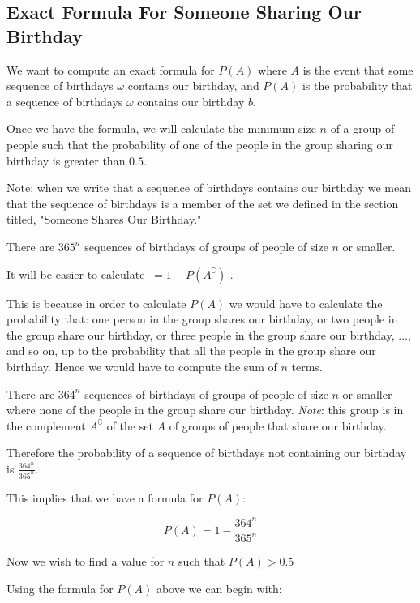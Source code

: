\documentclass[a4paper,11pt]{article}
\begin{document}
\subsection{Exact Formula For Someone Sharing Our Birthday}
We want to compute an exact formula for $P\left( A \right)$ where
$A$ is the event that some sequence of birthdays $\omega$ contains
our birthday, and $P\left( A \right)$ is the probability that a
sequence of birthdays $\omega$ contains our birthday $b$.

Once we have the formula, we will calculate the minimum size $n$
of a group of people such that the probability of one of the 
people in the group sharing our birthday is greater than $0.5$.

Note: when we write that a sequence of birthdays contains our birthday
we mean that the sequence of birthdays is a member of the set we
defined in the section titled, "Someone Shares Our Birthday."

There are $365^{n}$ sequences of birthdays of groups of people of size
$n$ or smaller.

It will be easier to calculate $\ = 1 - P\left( A^{\complement} \right)$ .

This is because in order to calculate $P\left(A\right)$ we would have
to calculate the probability that: one person in the group
shares our birthday, or two people in the group share our birthday, or
three people in the group share our birthday, ..., and so on,  up
to the probability that all the people in the group share our birthday.
Hence we would have to compute the sum of $n$ terms.

There are $364^{n}$ sequences of birthdays of groups of people of
size $n$ or smaller where none of the people in the group share our
birthday.  \textit{Note}: this group is in the complement $A^{\complement}$
of the set $A$ of groups of people that share our birthday.  


Therefore the probability of a sequence of birthdays not containing
our birthday is $\frac{364^{n}}{365^{n}}$.

This implies that we have a formula for $P \left( A \right)$:

\begin{equation}
  P\left( A \right) = 1 - \frac{364^{n}}{365^{n}}
\end{equation}

Now we wish to find a value for $n$ such that $P\left( A \right) > 0.5$

Using the formula for $P\left( A \right)$ above we can begin with:
\end{document}
